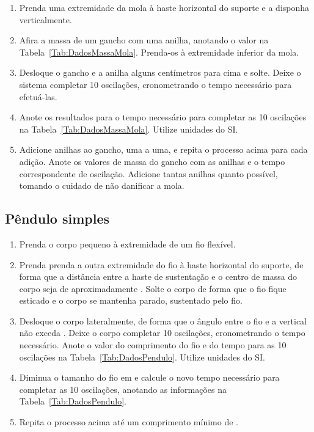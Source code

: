 \begin{enumerate}
\item Prenda uma extremidade da mola à haste horizontal do suporte e a disponha verticalmente.
\item Afira a massa de um gancho com uma anilha, anotando o valor na Tabela~\ref{Tab:DadosMassaMola}. Prenda-os à extremidade inferior da mola.
\item Desloque o gancho e a anilha alguns centímetros para cima e solte. Deixe o sistema completar 10 oscilações, cronometrando o tempo necessário para efetuá-las.
\item Anote os resultados para o tempo necessário para completar as 10 oscilações na Tabela~\ref{Tab:DadosMassaMola}. Utilize unidades do SI.
\item Adicione anilhas ao gancho, uma a uma, e repita o processo acima para cada adição. Anote os valores de massa do gancho com as anilhas e o tempo correspondente de oscilação. Adicione tantas anilhas quanto possível, tomando o cuidado de não danificar a mola.
\end{enumerate}

\subsection{Pêndulo simples}

\begin{enumerate}
	\item Prenda o corpo pequeno à extremidade de um fio flexível.
	\item Prenda prenda a outra extremidade do fio à haste horizontal do suporte, de forma que a distância entre a haste de sustentação e o centro de massa do corpo seja de aproximadamente . Solte o corpo de forma que o fio fique esticado e o corpo se mantenha parado, sustentado pelo fio.
	\item Desloque o corpo lateralmente, de forma que o ângulo entre o fio e a vertical não exceda . Deixe o corpo completar 10 oscilações, cronometrando o tempo necessário. Anote o valor do comprimento do fio e do tempo para as 10 oscilações na Tabela~\ref{Tab:DadosPendulo}. Utilize unidades do SI.
	\item Diminua o tamanho do fio em  e calcule o novo tempo necessário para completar as 10 oscilações, anotando as informações na Tabela~\ref{Tab:DadosPendulo}.
	\item Repita o processo acima até um comprimento mínimo de .
\end{enumerate}


